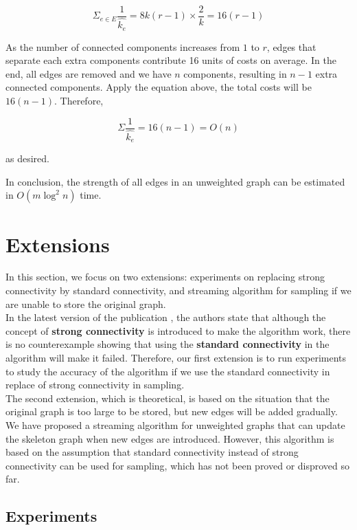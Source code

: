 \documentclass{article}
\begin{document}
\begin{equation}
    \Sigma_{e \in E} \frac{1}{\hat{k_e}} = 8k(r-1) \times \frac{2}{k} = 16(r-1)
\end{equation}

As the number of connected components increases from $1$ to $r$, edges that separate each extra components contribute 16 units of costs on average.
In the end, all edges are removed and we have $n$ components, resulting in $n-1$ extra connected components. Apply the equation above, the total costs will be $16(n-1)$. Therefore, 

\begin{equation}
    \Sigma \frac{1}{\hat{k_e}} = 16(n-1) = O(n)
\end{equation}

as desired.

In conclusion, the strength of all edges in an unweighted graph can be estimated in $O(m \log^2 n)$ time.

\section{Extensions}
In this section, we focus on two extensions: experiments on replacing strong connectivity by standard connectivity, and streaming algorithm for sampling if we are unable to store the original graph. \\

In the latest version of the publication \citep{benczur207078randomized}, the authors state that although the concept of \textbf{strong connectivity} is introduced to make the algorithm work, there is no counterexample showing that using the \textbf{standard connectivity} in the algorithm will make it failed. Therefore, our first extension is to run experiments to study the accuracy of the algorithm if we use the standard connectivity in replace of strong connectivity in sampling. \\

The second extension, which is theoretical, is based on the situation that the original graph is too large to be stored, but new edges will be added gradually. We have proposed a streaming algorithm for unweighted graphs that can update the skeleton graph when new edges are introduced. However, this algorithm is based on the assumption that standard connectivity instead of strong connectivity can be used for sampling, which has not been proved or disproved so far.

\subsection{Experiments}
\end{document}
